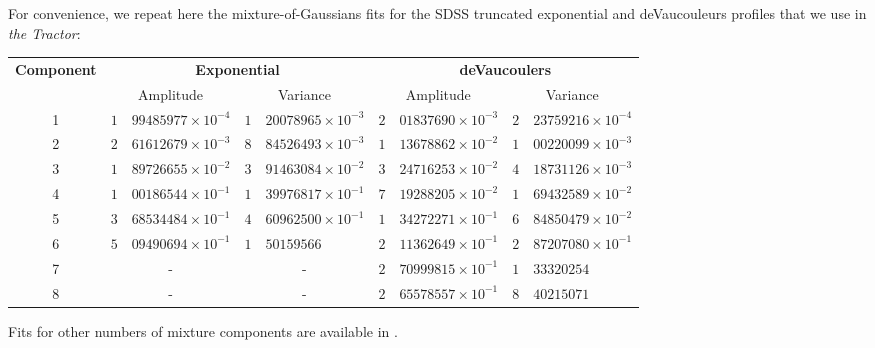 \documentclass[11pt,preprint]{aastex}
\newcommand{\project}[1]{\textsl{#1}}
\begin{document}

For convenience, we repeat here the mixture-of-Gaussians fits for the
SDSS truncated exponential and deVaucouleurs profiles that we use in
\project{the Tractor}:
\begin{center}
\begin{tabular}{cr@{.}lr@{.}lr@{.}lr@{.}l}
\hline
\textbf{Component} &
\multicolumn{4}{c}{\textbf{Exponential}} & 
\multicolumn{4}{c}{\textbf{deVaucoulers}} \\
& \multicolumn{2}{c}{Amplitude}
& \multicolumn{2}{c}{Variance}
& \multicolumn{2}{c}{Amplitude}
& \multicolumn{2}{c}{Variance} \\
\hline
1 & 
$1$ & $99485977 \times 10^{-4}$
&
$1$ & $20078965 \times 10^{-3}$
&
$2$ & $01837690 \times 10^{-3}$
&
$2$ & $23759216 \times 10^{-4}$
\\
%
2 &
$2$ & $61612679 \times 10^{-3}$
&
$8$ & $84526493 \times 10^{-3}$
&
$1$ & $13678862 \times 10^{-2}$
&
$1$ & $00220099 \times 10^{-3}$
\\
%
3 &
$1$ & $89726655 \times 10^{-2}$
&
$3$ & $91463084 \times 10^{-2}$
&
$3$ & $24716253 \times 10^{-2}$
&
$4$ & $18731126 \times 10^{-3}$
\\
%
4 &
$1$ & $00186544 \times 10^{-1}$
&
$1$ & $39976817 \times 10^{-1}$
&
$7$ & $19288205 \times 10^{-2}$
&
$1$ & $69432589 \times 10^{-2}$
\\
%
5 &
$3$ & $68534484 \times 10^{-1}$
&
$4$ & $60962500 \times 10^{-1}$
&
$1$ & $34272271 \times 10^{-1}$
&
$6$ & $84850479 \times 10^{-2}$
\\
%
6 &
$5$ & $09490694 \times 10^{-1}$
&
$1$ & $50159566$
&
$2$ & $11362649 \times 10^{-1}$
&
$2$ & $87207080 \times 10^{-1}$
\\
%
7 &
\multicolumn{2}{c}{-} &
\multicolumn{2}{c}{-} &
$2$ & $70999815 \times 10^{-1}$
&
$1$ & $33320254$
\\
%
8 &
\multicolumn{2}{c}{-} &
\multicolumn{2}{c}{-} &
$2$ & $65578557 \times 10^{-1}$
&
$8$ & $40215071$
\\
\hline
\end{tabular}
\end{center}
Fits for other numbers of mixture components are available in
\cite{moggalaxy}.
\end{document}
